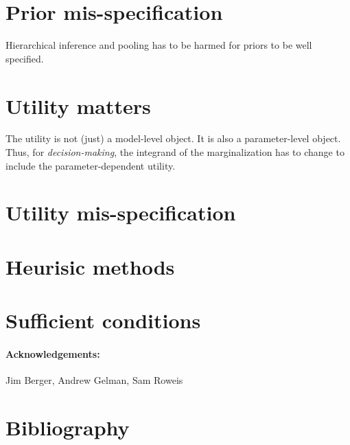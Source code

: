 \documentclass[12pt]{article}
\begin{document}
\section{Prior mis-specification}

Hierarchical inference and pooling has to be harmed for priors to be well specified.

\section{Utility matters}

The utility is not (just) a model-level object.
It is also a parameter-level object.
Thus, for \emph{decision-making},
  the integrand of the marginalization has to change to include the parameter-dependent utility.

\section{Utility mis-specification}

\section{Heurisic methods}

\section{Sufficient conditions}


\paragraph{Acknowledgements:}
Jim Berger,
Andrew Gelman,
Sam Roweis

\section*{Bibliography}
\end{document}
